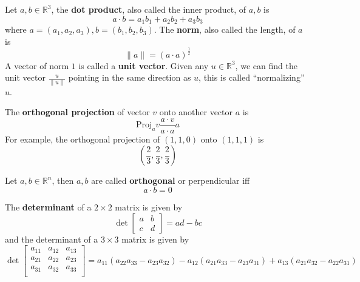 \documentclass[openany]{book}
\newcommand{\R}{\mathbb{R}}
\begin{document}
\begin{defn}
    Let $a,b\in\R^3$, the \textbf{dot product}, also called the inner product, of $a,b$ is 
    \begin{equation*}
        a\cdot b=a_1b_1+a_2b_2+a_3b_3
    \end{equation*}
    where $a=(a_1,a_2,a_3), b=(b_1,b_2,b_3)$. The \textbf{norm}, also called the length, of $a$ is 
    \begin{equation*}
        \|a\|=(a\cdot a)^\frac{1}{2}
    \end{equation*}
    A vector of norm $1$ is called a \textbf{unit vector}. Given any $u\in\R^3$, we can find the unit vector $\frac{u}{\|u\|}$ pointing in the same direction as $u$, this is called ``normalizing'' $u$.
\end{defn}


\begin{defn}
    The \textbf{orthogonal projection} of vector $v$ onto another vector $a$ is
    \begin{equation*}
        \text{Proj}_av\frac{a\cdot v}{a\cdot a}a
    \end{equation*}
    For example, the orthogonal projection of $(1,1,0)$ onto $(1,1,1)$ is 
    \begin{equation*}
        \left(\frac{2}{3}, \frac{2}{3},\frac{2}{3}\right)
    \end{equation*}
\end{defn}


\begin{defn}[orthogonal]
    Let $a,b\in\R^n$, then $a,b$ are called \textbf{orthogonal} or perpendicular iff 
    \begin{equation*}
        a\cdot b=0
    \end{equation*}
\end{defn}


\begin{defn}[determinant]
    The \textbf{determinant} of a $2\times 2$ matrix is given by 
    \begin{equation*}
        \det\begin{bmatrix}
            a&b\\
            c&d
        \end{bmatrix}=ad-bc
    \end{equation*}
    and the determinant of a $3\times 3$ matrix is given by 
    \begin{equation*}
        \det\begin{bmatrix}
            a_{11}&a_{12}&a_{13}\\
            a_{21}&a_{22}&a_{23}\\
            a_{31}&a_{32}&a_{33}\\
        \end{bmatrix}=a_{11}(a_{22}a_{33}-a_{23}a_{32})-a_{12}(a_{21}a_{33}-a_{23}a_{31})+a_{13}(a_{21}a_{32}-a_{22}a_{31})
    \end{equation*}
\end{defn}
\end{document}
